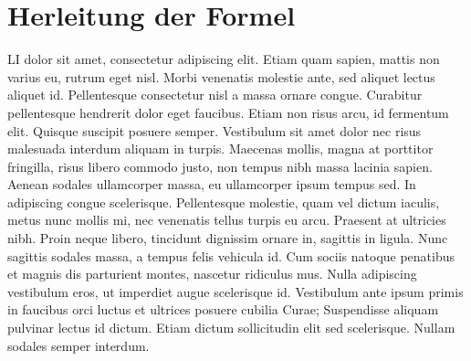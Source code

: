 \chapter{Herleitung der Formel}

  \ac{LI} dolor sit amet, consectetur adipiscing elit. Etiam quam sapien, mattis non varius eu, rutrum eget nisl. Morbi venenatis molestie ante, sed aliquet lectus aliquet id. Pellentesque consectetur nisl a massa ornare congue. Curabitur pellentesque hendrerit dolor eget faucibus. Etiam non risus arcu, id fermentum elit. Quisque suscipit posuere semper. Vestibulum sit amet dolor nec risus malesuada interdum aliquam in turpis. Maecenas mollis, magna at porttitor fringilla, risus libero commodo justo, non tempus nibh massa lacinia sapien. Aenean sodales ullamcorper massa, eu ullamcorper ipsum tempus sed. In adipiscing congue scelerisque. Pellentesque molestie, quam vel dictum iaculis, metus nunc mollis mi, nec venenatis tellus turpis eu arcu. Praesent at ultricies nibh. Proin neque libero, tincidunt dignissim ornare in, sagittis in ligula. Nunc sagittis sodales massa, a tempus felis vehicula id. Cum sociis natoque penatibus et magnis dis parturient montes, nascetur ridiculus mus. Nulla adipiscing vestibulum eros, ut imperdiet augue scelerisque id. Vestibulum ante ipsum primis in faucibus orci luctus et ultrices posuere cubilia Curae; Suspendisse aliquam pulvinar lectus id dictum. Etiam dictum sollicitudin elit sed scelerisque. Nullam sodales semper interdum.
